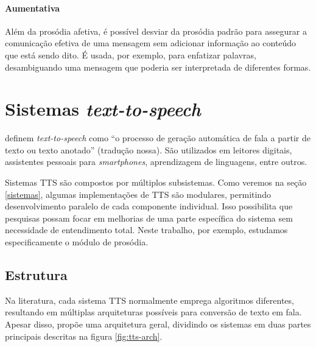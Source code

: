 \paragraph{Aumentativa} Além da prosódia afetiva, é possível desviar da prosódia
padrão para assegurar a comunicação efetiva de uma mensagem sem adicionar
informação ao conteúdo que está sendo dito. É usada, por exemplo, para
enfatizar palavras, desambiguando uma mensagem que poderia ser interpretada de
diferentes formas.

\section{Sistemas \emph{text-to-speech}}
 definem \emph{text-to-speech} como ``o processo de geração
automática de fala a partir de texto ou texto anotado'' (tradução nossa). São
utilizados em leitores digitais, assistentes pessoais para \emph{smartphones},
aprendizagem de linguagens, entre outros.

Sistemas TTS são compostos por múltiplos subsistemas. Como veremos na seção
\ref{sistemas}, algumas implementações de TTS são modulares, permitindo
desenvolvimento paralelo de cada componente individual. Isso possibilita que
pesquisas possam focar em melhorias de uma parte específica do sistema sem
necessidade de entendimento total. Neste trabalho, por exemplo, estudamos
especificamente o módulo de prosódia.

\subsection{Estrutura}
Na literatura, cada sistema TTS normalmente emprega algoritmos diferentes,
resultando em múltiplas arquiteturas possíveis para conversão de texto em fala.
Apesar disso,  propõe uma arquitetura geral, dividindo os
sistemas em duas partes principais descritas na figura \ref{fig:tts-arch}.


